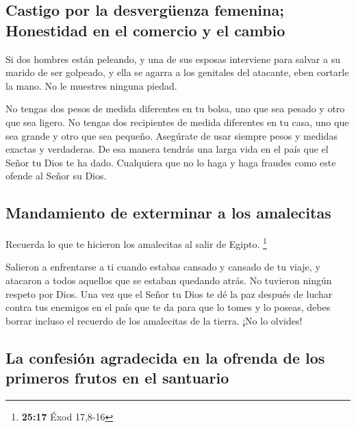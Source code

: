\hypertarget{castigo-por-la-desverguxfcenza-femenina-honestidad-en-el-comercio-y-el-cambio}{%
\subsection{Castigo por la desvergüenza femenina; Honestidad en el
comercio y el
cambio}\label{castigo-por-la-desverguxfcenza-femenina-honestidad-en-el-comercio-y-el-cambio}}

 Si dos hombres están peleando, y una de sus esposas
interviene para salvar a su marido de ser golpeado, y ella se agarra a
los genitales del atacante,  eben cortarle la mano. No le
muestres ninguna piedad.

 No tengas dos pesos de medida diferentes en tu bolsa,
uno que sea pesado y otro que sea ligero.  No tengas dos
recipientes de medida diferentes en tu casa, uno que sea grande y otro
que sea pequeño.  Asegúrate de usar siempre pesos y
medidas exactas y verdaderas. De esa manera tendrás una larga vida en el
país que el Señor tu Dios te ha dado.  Cualquiera que no
lo haga y haga fraudes como este ofende al Señor su Dios.

\hypertarget{mandamiento-de-exterminar-a-los-amalecitas}{%
\subsection{Mandamiento de exterminar a los
amalecitas}\label{mandamiento-de-exterminar-a-los-amalecitas}}

 Recuerda lo que te hicieron los amalecitas al salir de
Egipto. \footnote{\textbf{25:17} Éxod 17,8-16}

 Salieron a enfrentarse a ti cuando estabas cansado y
cansado de tu viaje, y atacaron a todos aquellos que se estaban quedando
atrás. No tuvieron ningún respeto por Dios.  Una vez que
el Señor tu Dios te dé la paz después de luchar contra tus enemigos en
el país que te da para que lo tomes y lo poseas, debes borrar incluso el
recuerdo de los amalecitas de la tierra. ¡No lo olvides!

\hypertarget{la-confesiuxf3n-agradecida-en-la-ofrenda-de-los-primeros-frutos-en-el-santuario}{%
\subsection{La confesión agradecida en la ofrenda de los primeros frutos
en el
santuario}\label{la-confesiuxf3n-agradecida-en-la-ofrenda-de-los-primeros-frutos-en-el-santuario}}

